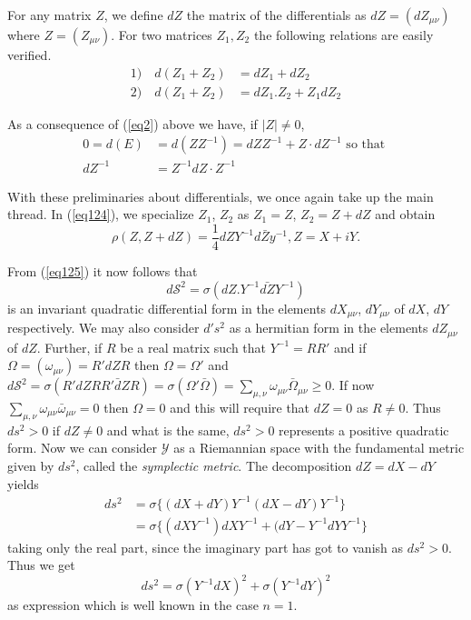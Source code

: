 For any matrix $Z$, we define $d Z$ the matrix of the differentials as
$d Z = (d Z_{\mu \nu})$ where $Z = (Z_{\mu \nu})$. For two matrices
$Z_1, Z_2$ the following relations are easily verified. 
\begin{align*}
1) \quad d(Z_1 + Z_2) & = d Z_1 + d Z_2 \tag{126}\label{eq126} \\
2) \quad d(Z_1 + Z_2) & = d Z_1. Z_2 + Z_1 dZ_2
\end{align*}

As a consequence of (\ref{eq2}) above we have, if $|Z| \neq 0$, 
\begin{align*}
0 = d (E) & = d (ZZ^{-1}) = dZ Z^{-1} + Z \cdot dZ^{-1} \text{ so that }\\ 
d Z^{-1} & = Z^{-1} dZ \cdot Z^{-1} \tag*{$(126)'$}\label{eq126'} 
\end{align*}

With these preliminaries about differentials, we once again take up
the main thread. In (\ref{eq124}), we specialize $Z_1$, $Z_2$ as $Z_1 = Z$,
$Z_2 = Z + dZ$ and obtain 
\begin{equation*}
\rho (Z , Z + d Z) = \frac{1}{4} dZ Y^{-1} d \bar{Z} y^{-1} , Z = X +i
Y. \tag{127}\label{eq127} 
\end{equation*}

From (\ref{eq125}) it now follows that 
\begin{equation*}
d \mathscr{S}^2 = \sigma (dZ . Y^{-1} \bar{dZ} Y^{-1}) \tag{128}\label{eq128}
\end{equation*}
is an invariant quadratic differential form in the elements $d X_{\mu
  \nu}$, $d Y_{\mu \nu}$ of $dX$, $dY$\pageoriginale respectively. We
may also consider 
$d's^2$ as a hermitian form in the elements $d Z_{\mu \nu}$
of $d Z$. Further, if $R$ be a real matrix such that $Y^{-1} = RR'$
and if $\Omega = (\omega_{\mu \nu}) = R' d Z R$ then $\Omega =
\Omega'$ and $d \mathscr{S}^2 = \sigma(R' dZ RR' \bar{d}Z R) = \sigma
(\Omega ' \bar{\Omega}) = \sum_{\mu ,\nu} \omega_{\mu \nu}
\bar{\Omega}_{\mu \nu} \ge 0$. If now $\sum_{\mu ,\nu} \omega_{\mu
  \nu} \bar{\omega}_{\mu \nu} = 0$ then $\Omega = 0$ and this will
require that $d Z = 0 $ as $R \neq 0$. Thus $d s^2 > 0$ if
$d Z \neq 0$ and what is the same, $d s^2>0$ represents a
positive quadratic form. Now we can consider $\mathscr{Y}$ as a
Riemannian space with the fundamental metric given by $d
s^2$, called the \textit{symplectic metric}. The
decomposition $d Z = dX - dY$ yields  
\begin{align*}
ds^2 & = \sigma \{ (d X + d Y) Y^{-1} (dX - dY)  Y^{-1}
\}\\ 
& = \sigma \{ (d X   Y^{-1}) dX  Y^{-1}  + (dY - Y^{-1} dY Y^{-1} \}
\end{align*}
taking only the real part, since the imaginary part has got to vanish
as $d s^2 > 0$. Thus we get 
\begin{equation*}
d s^2 = \sigma (Y^{-1} dX)^2 + \sigma (Y^{-1} dY)^2 \tag{129}\label{eq129}
\end{equation*}
as expression which is well known in the case $n = 1$. 


